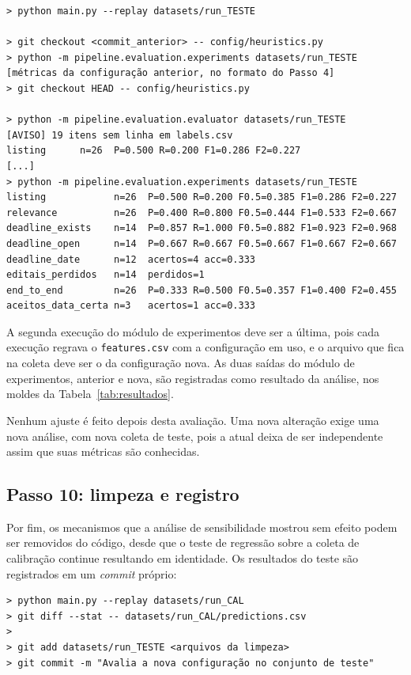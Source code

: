 \begin{footnotesize}
\begin{verbatim}
> python main.py --replay datasets/run_TESTE

> git checkout <commit_anterior> -- config/heuristics.py
> python -m pipeline.evaluation.experiments datasets/run_TESTE
[métricas da configuração anterior, no formato do Passo 4]
> git checkout HEAD -- config/heuristics.py

> python -m pipeline.evaluation.evaluator datasets/run_TESTE
[AVISO] 19 itens sem linha em labels.csv
listing      n=26  P=0.500 R=0.200 F1=0.286 F2=0.227
[...]
> python -m pipeline.evaluation.experiments datasets/run_TESTE
listing            n=26  P=0.500 R=0.200 F0.5=0.385 F1=0.286 F2=0.227
relevance          n=26  P=0.400 R=0.800 F0.5=0.444 F1=0.533 F2=0.667
deadline_exists    n=14  P=0.857 R=1.000 F0.5=0.882 F1=0.923 F2=0.968
deadline_open      n=14  P=0.667 R=0.667 F0.5=0.667 F1=0.667 F2=0.667
deadline_date      n=12  acertos=4 acc=0.333
editais_perdidos   n=14  perdidos=1
end_to_end         n=26  P=0.333 R=0.500 F0.5=0.357 F1=0.400 F2=0.455
aceitos_data_certa n=3   acertos=1 acc=0.333
\end{verbatim}
\end{footnotesize}

A segunda execução do módulo de experimentos deve ser a última, pois cada
execução regrava o \texttt{features.csv} com a configuração em uso, e o
arquivo que fica na coleta deve ser o da configuração nova. As duas saídas do
módulo de experimentos, anterior e nova, são registradas como resultado da
análise, nos moldes da Tabela~\ref{tab:resultados}.

Nenhum ajuste é feito depois desta avaliação. Uma nova alteração exige uma
nova análise, com nova coleta de teste, pois a atual deixa de ser independente
assim que suas métricas são conhecidas.

\subsection{Passo 10: limpeza e registro}

Por fim, os mecanismos que a análise de sensibilidade mostrou sem efeito podem
ser removidos do código, desde que o teste de regressão sobre a coleta de
calibração continue resultando em identidade. Os resultados do teste são
registrados em um \textit{commit} próprio:

\begin{footnotesize}
\begin{verbatim}
> python main.py --replay datasets/run_CAL
> git diff --stat -- datasets/run_CAL/predictions.csv
>
> git add datasets/run_TESTE <arquivos da limpeza>
> git commit -m "Avalia a nova configuração no conjunto de teste"
\end{verbatim}
\end{footnotesize}

